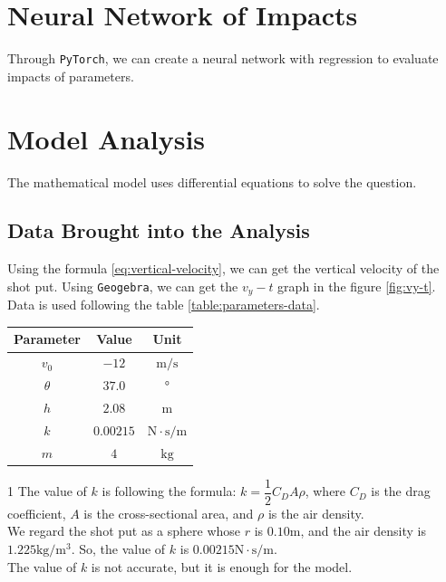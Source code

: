\documentclass{article}
\begin{document}
\section{Neural Network of Impacts}

Through \texttt{PyTorch}, we can create a neural network with regression to evaluate impacts of parameters.

\section{Model Analysis}

The mathematical model uses differential equations to solve the question.

\subsection{Data Brought into the Analysis}

Using the formula \ref{eq:vertical-velocity}, we can get the vertical velocity of the shot put. Using \texttt{Geogebra}, we can get the $v_y-t$ graph in the figure \ref{fig:vy-t}. Data is used following the table \ref{table:parameters-data}.

\begin{table}[H]
  \centering
  \begin{threeparttable}
    \begin{tabular}{ccc}
      \hline
      \hspace{1cm}\textbf{Parameter}\hspace{1cm} & \hspace{1cm}\textbf{Value}\hspace{1cm} & \hspace{1cm}\textbf{Unit}\hspace{1cm} \\
      \hline
      $v_0$ & $-12$ & $\si{\meter/\second}$ \\
      $\theta$ & $37.0$ & $\si{\degree}$ \\
      $h$ & $2.08$ & $\si{\meter}$ \\
      $k$ & $0.00215$ \tnote{1} & $\si{\newton\cdot\second/\meter}$ \\
      $m$ & $4$ & $\si{\kilo\gram}$ \\
      \hline
    \end{tabular}
    \begin{tablenotes}
      \item [1] The value of $k$ is following the formula: $k=\dfrac{1}{2}C_DA\rho$, where $C_D$ is the drag coefficient, $A$ is the cross-sectional area, and $\rho$ is the air density. \\
      We regard the shot put as a sphere whose $r$ is $0.10 \si{\meter}$, and the air density is $1.225\si{\kilo\gram/\meter^3}$. So, the value of $k$ is $0.00215\si{\newton\cdot\second/\meter}$. \\
      The value of $k$ is not accurate, but it is enough for the model.
    \end{tablenotes}
  \end{threeparttable}
\end{table}
\end{document}
